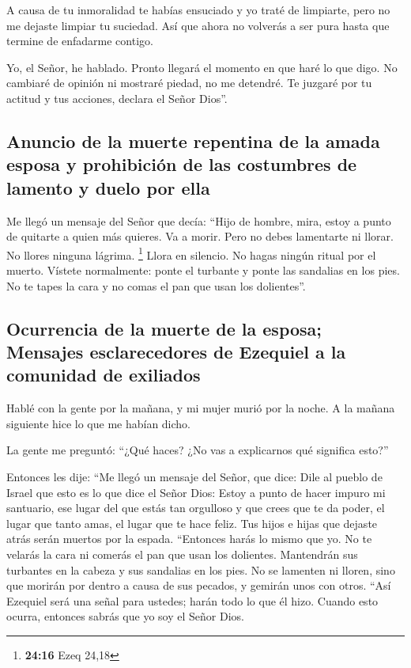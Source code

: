  A causa de tu inmoralidad te habías ensuciado y yo traté
de limpiarte, pero no me dejaste limpiar tu suciedad. Así que ahora no
volverás a ser pura hasta que termine de enfadarme contigo.

 Yo, el Señor, he hablado. Pronto llegará el momento en
que haré lo que digo. No cambiaré de opinión ni mostraré piedad, no me
detendré. Te juzgaré por tu actitud y tus acciones, declara el Señor
Dios''.

\hypertarget{anuncio-de-la-muerte-repentina-de-la-amada-esposa-y-prohibiciuxf3n-de-las-costumbres-de-lamento-y-duelo-por-ella}{%
\subsection{Anuncio de la muerte repentina de la amada esposa y
prohibición de las costumbres de lamento y duelo por
ella}\label{anuncio-de-la-muerte-repentina-de-la-amada-esposa-y-prohibiciuxf3n-de-las-costumbres-de-lamento-y-duelo-por-ella}}

 Me llegó un mensaje del Señor que decía: 
``Hijo de hombre, mira, estoy a punto de quitarte a quien más quieres.
Va a morir. Pero no debes lamentarte ni llorar. No llores ninguna
lágrima. \footnote{\textbf{24:16} Ezeq 24,18}  Llora en
silencio. No hagas ningún ritual por el muerto. Vístete normalmente:
ponte el turbante y ponte las sandalias en los pies. No te tapes la cara
y no comas el pan que usan los dolientes''.

\hypertarget{ocurrencia-de-la-muerte-de-la-esposa-mensajes-esclarecedores-de-ezequiel-a-la-comunidad-de-exiliados}{%
\subsection{Ocurrencia de la muerte de la esposa; Mensajes
esclarecedores de Ezequiel a la comunidad de
exiliados}\label{ocurrencia-de-la-muerte-de-la-esposa-mensajes-esclarecedores-de-ezequiel-a-la-comunidad-de-exiliados}}

 Hablé con la gente por la mañana, y mi mujer murió por
la noche. A la mañana siguiente hice lo que me habían dicho.

 La gente me preguntó: ``¿Qué haces? ¿No vas a
explicarnos qué significa esto?''

 Entonces les dije: ``Me llegó un mensaje del Señor, que
dice:  Dile al pueblo de Israel que esto es lo que dice
el Señor Dios: Estoy a punto de hacer impuro mi santuario, ese lugar del
que estás tan orgulloso y que crees que te da poder, el lugar que tanto
amas, el lugar que te hace feliz. Tus hijos e hijas que dejaste atrás
serán muertos por la espada.  ``Entonces harás lo mismo
que yo. No te velarás la cara ni comerás el pan que usan los dolientes.
 Mantendrán sus turbantes en la cabeza y sus sandalias en
los pies. No se lamenten ni lloren, sino que morirán por dentro a causa
de sus pecados, y gemirán unos con otros.  ``Así Ezequiel
será una señal para ustedes; harán todo lo que él hizo. Cuando esto
ocurra, entonces sabrás que yo soy el Señor Dios.

